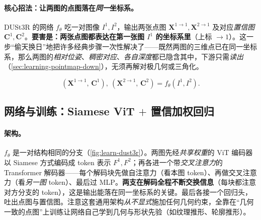 \paragraph{核心招法：让两图的点图落在\emph{同一}坐标系。}
DUSt3R 的网络 $f_\theta$ 吃一对图像 $I^1,I^2$，输出两张点图 $\mathbf{X}^{1\to1},\mathbf{X}^{2\to1}$ 及对应\emph{置信图} $\mathbf{C}^{1},\mathbf{C}^{2}$\cite{wang2024dust3r}。\textbf{要害是：两张点图都表达在第一张图 $I^1$ 的坐标系里}（上标 $\to1$）。这一步“偷天换日”地把许多经典步骤一次性解决了——既然两图的三维点已在同一坐标系，那么两图的\emph{相对位姿}、\emph{稠密对应}、\emph{各自深度}都已隐含其中，下游只需\emph{读出}（\cref{sec:learning-pointmap-down}），无须再解对极几何或三角化。

\begin{equation}
  (\mathbf{X}^{1\to1},\,\mathbf{C}^{1}),\ (\mathbf{X}^{2\to1},\,\mathbf{C}^{2})=f_\theta(I^1,I^2).
  \label{eq:learn-pointmap}
\end{equation}

\subsection{网络与训练：Siamese ViT $+$ 置信加权回归}
\label{sec:learning-pointmap-net}

\paragraph{架构。}
$f_\theta$ 是一对结构相同的分支（\cref{fig:learn-dust3r}）。两图先经\emph{共享权重}的 ViT 编码器以 Siamese 方式编码成 token 表示 $F^1,F^2$；再各进一个带\emph{交叉注意力}的 Transformer 解码器——每个解码块先做自注意力（看本图 token）、再做交叉注意力（看\emph{另一图} token）、最后过 MLP。\textbf{两支在解码全程不断交换信息}（每块都注意对方分支的 token），这是输出能落在同一坐标系的关键。最后各接一个回归头，吐出点图与置信图。注意这套通用架构\emph{从不显式}施加任何几何约束，全靠在“几何一致的点图”上训练让网络自己学到几何与形状先验（如纹理推形、轮廓推形）。

